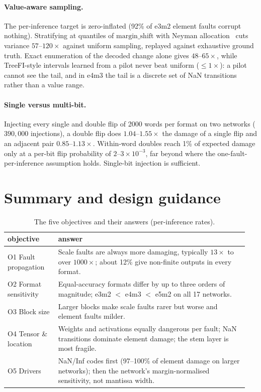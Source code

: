 \documentclass[10pt,a4paper]{article}
\begin{document}
\paragraph{Value-aware sampling.} The per-inference target is zero-inflated (92\% of e3m2 element
faults corrupt nothing). Stratifying at quantiles of $\mathrm{margin\_shift}$ with Neyman
allocation~\cite{neyman1934} cuts variance $57$--$120\times$ against uniform sampling, replayed
against exhaustive ground truth. Exact enumeration of the decoded change alone gives
$48$--$65\times$, while TreeFI-style intervals learned from a pilot never beat uniform
($\le1\times$): a pilot cannot see the tail, and in e4m3 the tail is a discrete set of NaN
transitions rather than a value range.

\paragraph{Single versus multi-bit.} Injecting every single and double flip of 2000 words per
format on two networks ($390{,}000$ injections), a double flip does $1.04$--$1.55\times$ the damage
of a single flip and an adjacent pair $0.85$--$1.13\times$. Within-word doubles reach 1\% of
expected damage only at a per-bit flip probability of $2$--$3\times10^{-3}$, far beyond where the
one-fault-per-inference assumption holds. Single-bit injection is sufficient.

\section{Summary and design guidance}

\begin{table}[htbp]
\centering\small
\caption{The five objectives and their answers (per-inference rates).}
\label{tab:objectives}
\begin{tabular}{@{}L{0.2\linewidth}L{0.75\linewidth}@{}}
\toprule
objective & answer \\
\midrule
O1 Fault propagation & Scale faults are always more damaging, typically $13\times$ to over
$1000\times$; about 12\% give non-finite outputs in every format. \\
O2 Format sensitivity & Equal-accuracy formats differ by up to three orders of magnitude;
e3m2 $<$ e4m3 $<$ e5m2 on all 17 networks. \\
O3 Block size & Larger blocks make scale faults rarer but worse and element faults milder. \\
O4 Tensor \& location & Weights and activations equally dangerous per fault; NaN transitions
dominate element damage; the stem layer is most fragile. \\
O5 Drivers & NaN/Inf codes first (97--100\% of element damage on larger networks); then the
network's margin-normalised sensitivity, not mantissa width. \\
\bottomrule
\end{tabular}
\end{table}
\end{document}
